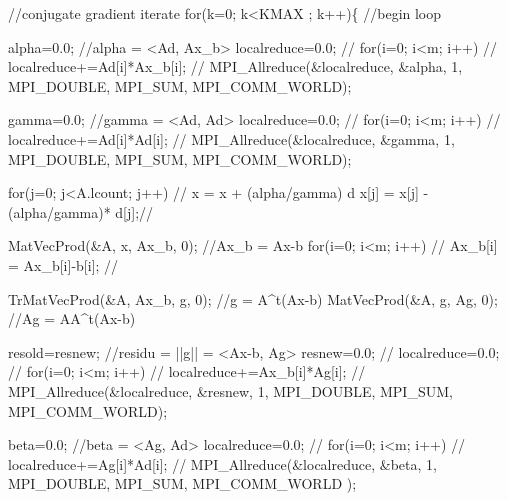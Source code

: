 \begin{DoxyCode}
    \textcolor{comment}{//conjugate gradient iterate}
    \textcolor{keywordflow}{for}(k=0; k<KMAX ; k++)\{               \textcolor{comment}{//begin loop}
   
      alpha=0.0;                          \textcolor{comment}{//alpha = <Ad, Ax\_b>}
      localreduce=0.0;                    \textcolor{comment}{//}
      \textcolor{keywordflow}{for}(i=0; i<m; i++)                  \textcolor{comment}{//         }
        localreduce+=Ad[i]*Ax\_b[i];       \textcolor{comment}{//}
      MPI\_Allreduce(&localreduce, &alpha, 1, MPI\_DOUBLE, MPI\_SUM, 
      MPI\_COMM\_WORLD);
   
      gamma=0.0;                          \textcolor{comment}{//gamma = <Ad, Ad>}
      localreduce=0.0;                    \textcolor{comment}{//}
      \textcolor{keywordflow}{for}(i=0; i<m; i++)                  \textcolor{comment}{//         }
        localreduce+=Ad[i]*Ad[i];         \textcolor{comment}{//}
      MPI\_Allreduce(&localreduce, &gamma, 1, MPI\_DOUBLE, MPI\_SUM, 
      MPI\_COMM\_WORLD);
   
      \textcolor{keywordflow}{for}(j=0; j<A.lcount; j++)           \textcolor{comment}{// x = x + (alpha/gamma) d }
        x[j] = x[j] - (alpha/gamma)* d[j];\textcolor{comment}{//}
   
      MatVecProd(&A, x, Ax\_b, 0);         \textcolor{comment}{//Ax\_b = Ax-b}
      \textcolor{keywordflow}{for}(i=0; i<m; i++)                  \textcolor{comment}{// }
        Ax\_b[i] = Ax\_b[i]-b[i];           \textcolor{comment}{//}
   
      TrMatVecProd(&A, Ax\_b, g, 0);       \textcolor{comment}{//g  = A^t(Ax-b)}
      MatVecProd(&A, g, Ag, 0);           \textcolor{comment}{//Ag = AA^t(Ax-b)}
   
      resold=resnew;                      \textcolor{comment}{//residu = ||g|| = <Ax-b, Ag>}
      resnew=0.0;                         \textcolor{comment}{//}
      localreduce=0.0;                    \textcolor{comment}{//}
      \textcolor{keywordflow}{for}(i=0; i<m; i++)                  \textcolor{comment}{//         }
        localreduce+=Ax\_b[i]*Ag[i];       \textcolor{comment}{//}
      MPI\_Allreduce(&localreduce, &resnew, 1, MPI\_DOUBLE, MPI\_SUM, 
      MPI\_COMM\_WORLD);
   
      beta=0.0;                           \textcolor{comment}{//beta = <Ag, Ad>}
      localreduce=0.0;                    \textcolor{comment}{//}
      \textcolor{keywordflow}{for}(i=0; i<m; i++)                  \textcolor{comment}{//         }
        localreduce+=Ag[i]*Ad[i];         \textcolor{comment}{//}
      MPI\_Allreduce(&localreduce, &beta, 1, MPI\_DOUBLE, MPI\_SUM, MPI\_COMM\_WORLD
      );
   

\end{DoxyCode}
